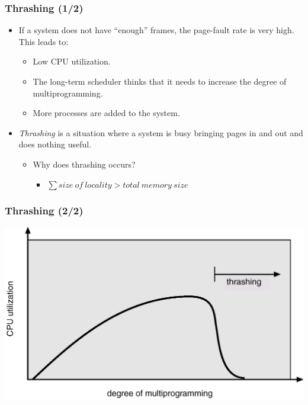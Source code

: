 \documentclass[CJKutf8,xcolor=pdftex,dvipsnames,table]{beamer}
\begin{document}
\begin{CJK*}{UTF8}{song}
  \begin{frame}
    \frametitle{Thrashing (1/2)} \pause
    \begin{itemize}\parskip=0pt
    \item{If a system does not have ``enough'' frames, the page-fault rate is very high. This leads to:} \pause
      \begin{itemize}
      \item{Low CPU utilization.} \pause
      \item{The long-term scheduler thinks that it needs to increase the degree of multiprogramming.} \pause
      \item{More processes are added to the system.} \pause
      \end{itemize}
    \item{\emph{Thrashing} is a situation where a system is busy bringing pages in and out and does nothing useful.} \pause
      \begin{itemize}
      \item{Why does thrashing occurs?} \pause
        \begin{itemize}
        \item{$\sum{size\ of\ locality} > total\ memory\ size$}
        \end{itemize}
      \end{itemize}
    \end{itemize}
  \end{frame}
  
  \begin{frame}
    \frametitle{Thrashing (2/2)} \pause
    \begin{center}
      \includegraphics[scale=0.3]{v6f10-15}
    \end{center}
  \end{frame}
  

\end{CJK*}
\end{document}
